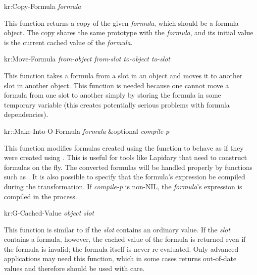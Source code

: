 \value{f-top}
\begin{example}
kr:Copy-Formula {\it formula}\value{function}
\end{example}

This function returns a copy of the given {\it formula}, which should be a
formula object.  The copy shares the same prototype with the {\it formula}, and
its initial value is the current cached value of the {\it formula}.


\value{f-top}
\begin{example}
kr:Move-Formula {\it from-object from-slot to-object to-slot}\value{function}
\end{example}

This function takes a formula from a
slot in an object and moves it to another slot in another object.  This
function is needed because one cannot move a formula from one slot to
another simply by storing the formula in some temporary variable (this
creates potentially serious problems with formula dependencies).


\value{f-top}
\begin{example}
kr::Make-Into-O-Formula {\it formula} \&optional {\it compile-p}  \value{function}
\end{example}

This function modifies formulas created using the
function  to behave as if they were created using
.  This is useful for tools like Lapidary that need to
construct formulas on the fly.  The converted formulas will be handled
properly by
functions such as .  It is also possible to specify that
the formula's expression be compiled during the transformation.
If {\it compile-p} is non-NIL, the
{\it formula}'s expression is compiled in the process.


\value{f-top}
\begin{example}
kr:G-Cached-Value {\it object slot}\value{function}
\end{example}

This function is similar to  if the {\it slot} contains an
ordinary value.  If the {\it slot} contains a formula, however, the cached
value of the formula is returned even if the formula
is invalid; the formula itself is never re-evaluated.  Only advanced
applications may need this function, which in some cases
returns out-of-date values and therefore should be used with care.



